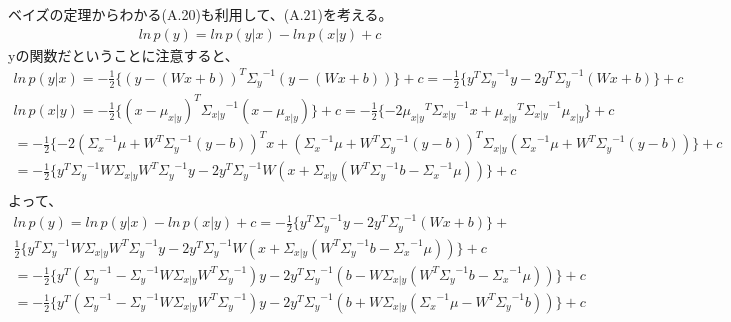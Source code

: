 \documentclass{jsarticle}
\begin{document}
ベイズの定理からわかる(A.20)も利用して、(A.21)を考える。
\begin{equation}
\begin{split}
ln \, p(y) = ln \, p(y|x) - ln \, p(x|y) + c
\end{split}
\end{equation}
yの関数だということに注意すると、
\begin{equation}
\begin{split}
ln \, p(y|x) = -\frac{1}{2} \{ (y - (Wx+b))^T {\Sigma_y}^{-1}(y - (Wx + b))\}+c 
= -\frac{1}{2} \{ y^T {\Sigma_y}^{-1} y - 2 y^T {\Sigma_y}^{-1} (Wx+b)\}+c
\end{split}
\end{equation}
\begin{equation}
\begin{split}
ln \, p(x|y) = -\frac{1}{2} \{ (x - \mu_{x|y})^T {\Sigma_{x|y}}^{-1}(x - \mu_{x|y})\}+c 
= -\frac{1}{2} \{ -2{\mu_{x|y}}^T {\Sigma_{x|y}}^{-1} x + {\mu_{x|y}}^T {\Sigma_{x|y}}^{-1} \mu_{x|y}\}+c\\
= -\frac{1}{2} \{ -2({\Sigma_x}^{-1}\mu + W^T {\Sigma_y}^{-1}(y-b))^T x + ({\Sigma_x}^{-1}\mu + W^T {\Sigma_y}^{-1}(y-b))^T {\Sigma_{x|y}} ({\Sigma_x}^{-1}\mu + W^T {\Sigma_y}^{-1}(y-b)) \}+c\\
= -\frac{1}{2} \{ y^T {\Sigma_y}^{-1}W\Sigma_{x|y} W^T{\Sigma_y}^{-1}y - 2y^T {\Sigma_y}^{-1} W(x + {\Sigma_{x|y}}(W^T{\Sigma_y}^{-1}b - {\Sigma_x}^{-1}\mu))\}+c\\
\end{split}
\end{equation}
よって、
\begin{equation}
\begin{split}
ln \, p(y) = ln \, p(y|x) - ln \, p(x|y) + c = -\frac{1}{2} \{ y^T {\Sigma_y}^{-1} y - 2 y^T {\Sigma_y}^{-1} (Wx+b)\} + \\
\frac{1}{2} \{ y^T {\Sigma_y}^{-1}W\Sigma_{x|y} W^T{\Sigma_y}^{-1}y - 2y^T {\Sigma_y}^{-1} W(x + {\Sigma_{x|y}}(W^T{\Sigma_y}^{-1}b - {\Sigma_x}^{-1}\mu))\} + c\\
= -\frac{1}{2} \{ y^T ({\Sigma_y}^{-1} - {\Sigma_y}^{-1}W\Sigma_{x|y} W^T{\Sigma_y}^{-1}) y - 2 y^T {\Sigma_y}^{-1} (b - W{\Sigma_{x|y}}(W^T{\Sigma_y}^{-1}b - {\Sigma_x}^{-1}\mu))\} + c\\
= -\frac{1}{2} \{ y^T ({\Sigma_y}^{-1} - {\Sigma_y}^{-1}W\Sigma_{x|y} W^T{\Sigma_y}^{-1}) y - 2 y^T {\Sigma_y}^{-1} (b + W{\Sigma_{x|y}}({\Sigma_x}^{-1}\mu - W^T{\Sigma_y}^{-1}b))\} + c\\
\end{split}
\end{equation}
\end{document}
